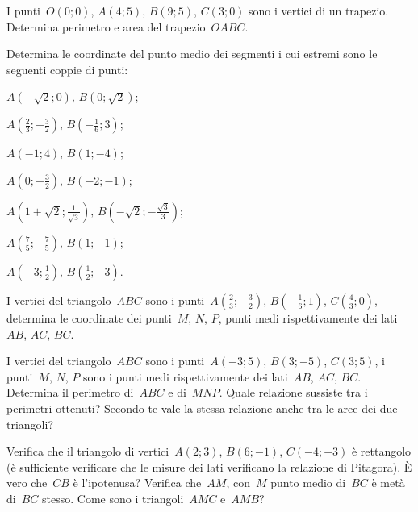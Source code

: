 \begin{esercizio}
\label{ese:D.31}
I punti~$O(0;0)$, $A(4;5)$, $B(9;5)$, $C(3;0)$ sono i vertici di un trapezio.
Determina perimetro e area del trapezio~$OABC$.
\end{esercizio}

\begin{esercizio}
\label{ese:D.32}
Determina le coordinate del punto medio dei segmenti i cui estremi sono le seguenti coppie di punti:
\begin{multicols}{2}
 \begin{enumeratea}
\item $A(-\sqrt{2};0)\text{, }B(0;\sqrt{2})$;
\item $A\left(\frac{2}{3};-\frac{3}{2}\right)\text{, }B\left(-{\frac{1}{6}};3\right)$;
\item $A(-1;4)\text{, }B(1;-4)$;
\item $A\left(0;-\frac{3}{2}\right)\text{, }B\left(-2;-1\right)$;
\item $A\left(1+\sqrt{2};\frac{1}{\sqrt{3}}\right)\text{, }B\left(-\sqrt{2};-\frac{\sqrt{3}}{3}\right)$;
\item $A\left(\frac{7}{5};-\frac{7}{5}\right)\text{, }B(1;-1)$;
\item $A\left(-3;\frac{1}{2}\right)\text{, }B\left(\frac{1}{2};-3\right)$.
\end{enumeratea}
\end{multicols}
\end{esercizio}

\begin{esercizio}
\label{ese:D.33}
I vertici del triangolo~$ABC$ sono i punti~$A\left(\frac{2}{3};-\frac{3}{2}\right)$, $B\left(-{\frac{1}{6}};1\right)$,
$C\left(\frac{4}{3};0\right)$, determina le coordinate dei punti~$M$, $N$, $P$, punti medi rispettivamente dei lati
$AB$, $AC$, $BC$.
\end{esercizio}

\begin{esercizio}
\label{ese:D.34}
I vertici del triangolo~$ABC$ sono i punti~$A(-3;5)$, $B(3;-5)$, $C(3;5)$, i punti~$M$, $N$, $P$ sono i punti medi
rispettivamente dei lati~$AB$, $AC$, $BC$. Determina il perimetro di~$ABC$ e di~$MNP$.
Quale relazione sussiste tra i perimetri ottenuti? Secondo te vale la stessa relazione anche tra le aree dei due triangoli?
\end{esercizio}

\begin{esercizio}
\label{ese:D.35}
Verifica che il triangolo di vertici~$A(2;3)$, $B(6;-1)$, $C(-4;-3)$ è rettangolo (è sufficiente verificare
che le misure dei lati verificano la relazione di Pitagora). È vero che~$CB$ è l'ipotenusa?
Verifica che~$AM$, con~$M$ punto medio di~$BC$ è metà di~$BC$ stesso. Come sono i triangoli~${AMC}$ e~${AMB}$?
\end{esercizio}

